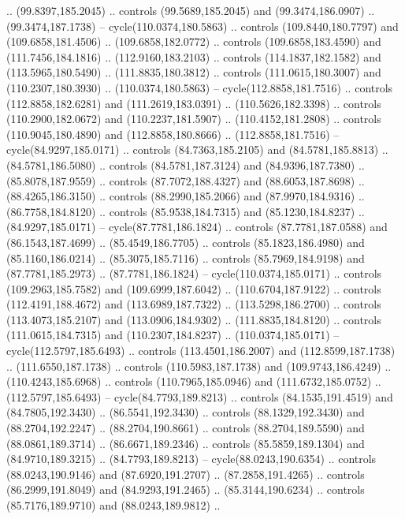 \begin{scope}[cm={{1.25,0.0,0.0,-1.25,(0.0,442.91375)}}]
    .. (99.8397,185.2045) .. controls (99.5689,185.2045) and (99.3474,186.0907) ..
    (99.3474,187.1738) -- cycle(110.0374,180.5863) .. controls (109.8440,180.7797)
    and (109.6858,181.4506) .. (109.6858,182.0772) .. controls (109.6858,183.4590)
    and (111.7456,184.1816) .. (112.9160,183.2103) .. controls (114.1837,182.1582)
    and (113.5965,180.5490) .. (111.8835,180.3812) .. controls (111.0615,180.3007)
    and (110.2307,180.3930) .. (110.0374,180.5863) -- cycle(112.8858,181.7516) ..
    controls (112.8858,182.6281) and (111.2619,183.0391) .. (110.5626,182.3398) ..
    controls (110.2900,182.0672) and (110.2237,181.5907) .. (110.4152,181.2808) ..
    controls (110.9045,180.4890) and (112.8858,180.8666) .. (112.8858,181.7516) --
    cycle(84.9297,185.0171) .. controls (84.7363,185.2105) and (84.5781,185.8813)
    .. (84.5781,186.5080) .. controls (84.5781,187.3124) and (84.9396,187.7380) ..
    (85.8078,187.9559) .. controls (87.7072,188.4327) and (88.6053,187.8698) ..
    (88.4265,186.3150) .. controls (88.2990,185.2066) and (87.9970,184.9316) ..
    (86.7758,184.8120) .. controls (85.9538,184.7315) and (85.1230,184.8237) ..
    (84.9297,185.0171) -- cycle(87.7781,186.1824) .. controls (87.7781,187.0588)
    and (86.1543,187.4699) .. (85.4549,186.7705) .. controls (85.1823,186.4980)
    and (85.1160,186.0214) .. (85.3075,185.7116) .. controls (85.7969,184.9198)
    and (87.7781,185.2973) .. (87.7781,186.1824) -- cycle(110.0374,185.0171) ..
    controls (109.2963,185.7582) and (109.6999,187.6042) .. (110.6704,187.9122) ..
    controls (112.4191,188.4672) and (113.6989,187.7322) .. (113.5298,186.2700) ..
    controls (113.4073,185.2107) and (113.0906,184.9302) .. (111.8835,184.8120) ..
    controls (111.0615,184.7315) and (110.2307,184.8237) .. (110.0374,185.0171) --
    cycle(112.5797,185.6493) .. controls (113.4501,186.2007) and
    (112.8599,187.1738) .. (111.6550,187.1738) .. controls (110.5983,187.1738) and
    (109.9743,186.4249) .. (110.4243,185.6968) .. controls (110.7965,185.0946) and
    (111.6732,185.0752) .. (112.5797,185.6493) -- cycle(84.7793,189.8213) ..
    controls (84.1535,191.4519) and (84.7805,192.3430) .. (86.5541,192.3430) ..
    controls (88.1329,192.3430) and (88.2704,192.2247) .. (88.2704,190.8661) ..
    controls (88.2704,189.5590) and (88.0861,189.3714) .. (86.6671,189.2346) ..
    controls (85.5859,189.1304) and (84.9710,189.3215) .. (84.7793,189.8213) --
    cycle(88.0243,190.6354) .. controls (88.0243,190.9146) and (87.6920,191.2707)
    .. (87.2858,191.4265) .. controls (86.2999,191.8049) and (84.9293,191.2465) ..
    (85.3144,190.6234) .. controls (85.7176,189.9710) and (88.0243,189.9812) ..

\end{scope}
